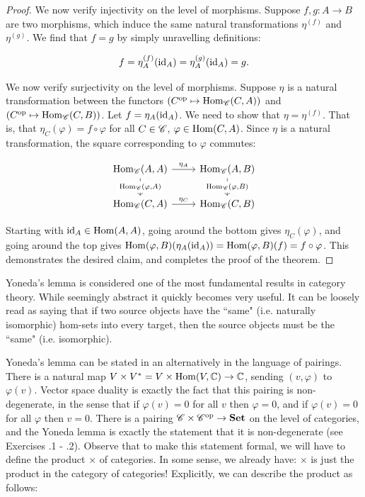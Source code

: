 \documentclass{article}
\theoremstyle{definition}
\numberwithin{figure}{section}
\begin{document}
\begin{proof}
We now verify injectivity on the level of morphisms. Suppose $f,g: A\to B$ are two morphisms, which induce the same natural transformations $\eta^{(f)}$ and $\eta^{(g)}$. We find that $f=g$ by simply unravelling definitions:

$$f=\eta^{(f)}_{A}(\mathrm{id}_A)=\eta^{(g)}_{A}(\mathrm{id}_A)=g.$$

We now verify surjectivity on the level of morphisms. Suppose $\eta$ is a natural transformation between the functors $\left(C^{\mathrm{op}}\mapsto \mathrm{Hom}_{\mathscr{C}}(C,A)\right)$ and $\left(C^{\mathrm{op}}\mapsto \mathrm{Hom}_{\mathscr{C}}(C,B)\right)$. Let $f=\eta_A(\mathrm{id}_A)$. We need to show that $\eta=\eta^{(f)}$. That is, that $\eta_C(\varphi)=f\circ \varphi$ for all $C\in \mathscr{C}$, $\varphi \in \mathrm{Hom}(C,A)$. Since $\eta$ is a natural transformation, the square corresponding to $\varphi$ commutes:

\[\begin{tikzcd}
	{\Hom_{\Ccat}(A,A)} & {\Hom_{\Ccat}(A,B)} \\
	{\Hom_{\Ccat}(C,A)} & {\Hom_{\Ccat}(C,B)}
	\arrow["{\eta_{C}}", from=2-1, to=2-2]
	\arrow["{\eta_{A}}", from=1-1, to=1-2]
	\arrow["{\Hom_{\Ccat}(\varphi,A)}"{description}, from=1-1, to=2-1]
	\arrow["{\Hom_{\Ccat}(\varphi,B)}"{description}, from=1-2, to=2-2]
\end{tikzcd}\]

Starting with $\mathrm{id}_A\in \mathrm{Hom}(A,A)$, going around the bottom gives $\eta_C(\varphi)$, and going around the top gives $\mathrm{Hom}(\varphi,B)(\eta_A(\mathrm{id}_A))=\mathrm{Hom}(\varphi,B)(f)=f\circ \varphi$. This demonstrates the desired claim, and completes the proof of the theorem.
\end{proof}

Yoneda's lemma is considered one of the most fundamental results in category theory. While seemingly abstract it quickly becomes very useful. It can be loosely read as saying that if two source objects have the ``same" (i.e. naturally isomorphic) hom-sets into every target, then the source objects must be the ``same" (i.e. isomorphic).

Yoneda's lemma can be stated in an alternatively in the language of pairings. There is a natural map $V\times V^*=V\times \mathrm{Hom}(V,\mathbb{C})\to \mathbb{C}$, sending $(v,\varphi)$ to $\varphi(v)$. Vector space duality is exactly the fact that this pairing is non-degenerate, in the sense that if $\varphi(v)=0$ for all $v$ then $\varphi=0$, and if $\varphi(v)=0$ for all $\varphi$ then $v=0$. There is a pairing $\mathscr{C} \times \mathscr{C}^{\mathrm{op}}\to \bold{Set}$ on the level of categories, and the Yoneda lemma is exactly the statement that it is non-degenerate (see Exercises \thesection.1 - \thesection.2). Observe that to make this statement formal, we will have to define the product $\times$ of categories. In some sense, we already have: $\times$ is just the product in the category of categories! Explicitly, we can describe the product as follows:
\end{document}
